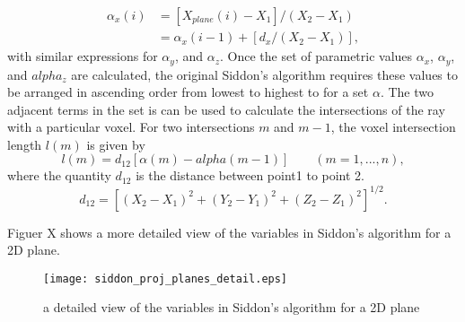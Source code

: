 \begin{equation}
\begin{aligned}
\alpha_x(i) &= \left[ X_{plane}(i) - X_1 \right] / (X_2 - X_1) \\
			&=\alpha_x(i-1) + \left[ d_x / (X_2 - X_1) \right],
\end{aligned}
\label{ea:siddon_alphas}
\end{equation}
with similar expressions for $\alpha_y$, and $\alpha_z$.  Once the set of parametric values $\alpha_x$, $\alpha_y$, and $alpha_z$ are calculated, the original Siddon's algorithm requires these values to be arranged in ascending order from lowest to highest to for a set ${\alpha}$.  The two adjacent terms in the set is can be used to calculate the intersections of the ray with a particular voxel.  For two intersections $m$ and $m-1$, the voxel intersection length $l(m)$ is given by 
\begin{equation}
l(m) = d_{12} \left[ \alpha(m) - alpha(m-1) \right] \qquad (m = 1, ..., n),
\label{eq:siddon_length}
\end{equation}
where the quantity $d_{12}$ is the distance between point1 to point 2.
\begin{equation}
d_{12} = \left[ (X_2 - X_1)^2 + (Y_2 - Y_1)^2 + (Z_2 - Z_1)^2 \right]^{1/2}.
\label{eq:siddon_d12}
\end{equation}

Figuer X shows a more detailed view of the variables in Siddon's algorithm for a 2D plane.


\begin{figure}[ht]
\centering
\texttt{[image: siddon\_proj\_planes\_detail.eps]}
\label{fig:siddon_plane_detail}
\caption{a detailed view of the variables in Siddon's algorithm for a 2D plane}
\end{figure}


